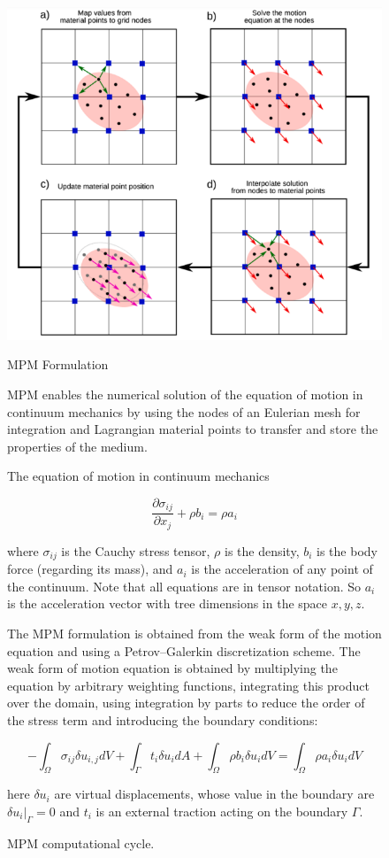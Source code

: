 \documentclass[11pt,a4paper]{article}
\begin{document}
\begin{figure}[h]
  \centering
  \includegraphics[width=.6\linewidth]{figures/mpm_cycle.png}
  \caption{MPM computational cycle.}
  \label{fig:mpm_cycle}

MPM Formulation

MPM enables the numerical solution of the equation of motion in continuum mechanics by using the nodes of an Eulerian mesh for integration and Lagrangian material points to transfer and store the properties of the medium.

The equation of motion in continuum mechanics

$$ \frac{\partial \sigma_{ij}}{\partial x_j} + \rho b_i = \rho a_i $$

where $\sigma_{ij} $ is the Cauchy stress tensor, $\rho$ is the density, $ b_i$ is the body force (regarding its mass), and $a_i$ is the acceleration of any point of the continuum.
Note that all equations are in tensor notation. So $a_i$ is the acceleration vector with tree dimensions in the space $x,y,z$.

The MPM formulation is obtained from the weak form of the motion equation and using a Petrov–Galerkin discretization scheme. The weak form of motion equation is obtained by multiplying the equation by arbitrary weighting functions, integrating this product over the domain, using integration by parts to reduce the order of the stress term and introducing the boundary conditions:

$$ -\int_{\Omega} \sigma_{i j} \delta u_{i, j} dV + \int_{\Gamma} t_i \delta u_i dA + \int_{\Omega} \rho b_i \delta u_i dV = \int_{\Omega} \rho a_i \delta u_i dV $$

here $\delta u_i$ are virtual displacements, whose value in the boundary are $\delta u_i |_{\Gamma} = 0$ and $t_i$ is an external traction acting on the boundary $\Gamma$.


\end{figure}
\end{document}
